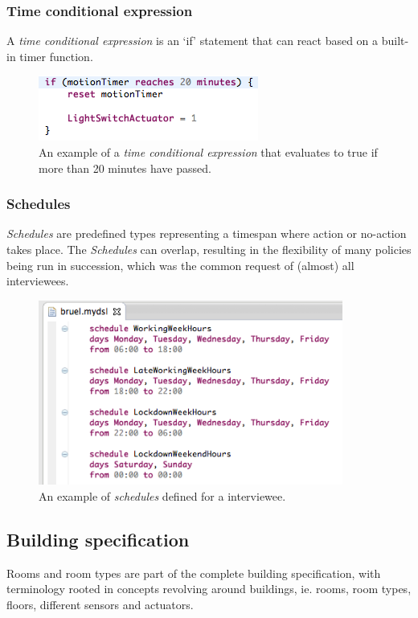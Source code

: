 \documentclass{llncs}
\begin{document}
\subsubsection{Time conditional expression}\label{subsubsec:conditionalexpression}
A \textit{time conditional expression} is an `if' statement that can react based on a built-in timer function. 

\begin{figure}
  \centering
    \includegraphics[scale=.6]{dsl-conditional-time-expression.png} 
	\caption{An example of a \textit{time conditional expression} that evaluates to true if more than 20 minutes have passed.}
	\label{fig:dsl-conditionalexpression}
\end{figure}

\newpage
\subsubsection{Schedules}\label{subsubsec:schedules}
\textit{Schedules} are predefined types representing a timespan where action or no-action takes place. The \textit{Schedules} can overlap, resulting in the flexibility of many policies being run in succession, which was the common request of (almost) all interviewees.

\begin{figure}
  	\centering
    \includegraphics[width=10cm]{dsl-schedules.png}
	\caption{An example of \textit{schedules} defined for a interviewee.}
	\label{fig:dsl-schedules}
\end{figure}

\newpage
\subsection{Building specification}\label{subsec:buildingspecification}
Rooms and room types are part of the complete building specification, with terminology rooted in concepts revolving around buildings, ie. rooms, room types, floors, different sensors and actuators. \\
\end{document}
